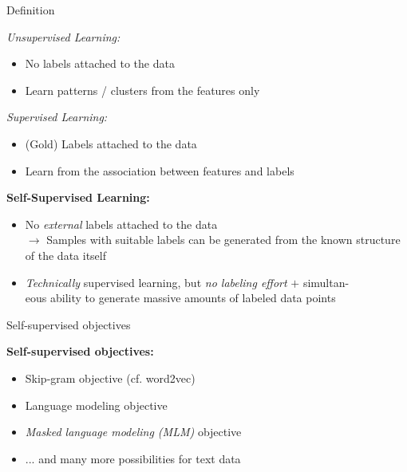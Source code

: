 \documentclass[11pt,compress,t,notes=noshow, xcolor=table]{beamer}
\begin{document}
\begin{frame}{Definition}

	\vfill 
	
	\textit{Unsupervised Learning:}

	\begin{itemize}
		\item No labels attached to the data
		\item Learn patterns / clusters from the features only
	\end{itemize}
	
	\textit{Supervised Learning:}

	\begin{itemize}
		\item (Gold) Labels attached to the data
		\item Learn from the association between features and labels
	\end{itemize}
	
	\textbf{Self-Supervised Learning:}

	\begin{itemize}
		\item No \textit{external} labels attached to the data\\
					$\to$ Samples with suitable labels can be generated from the known structure of the data itself 
		\item \textit{Technically} supervised learning, but \textit{no labeling effort} $+$ simultan-\\eous ability to generate massive amounts of labeled data points
	\end{itemize}
	
	\vfill 
	
\end{frame}


\begin{vbframe}{Self-supervised objectives}

\vfill

\textbf{Self-supervised objectives:}
	
	\begin{itemize}
		\item Skip-gram objective (cf. word2vec)
		\item Language modeling objective
		\item \textit{Masked language modeling (MLM)} objective
		\item ... and many more possibilities for text data
	\end{itemize}
\vfill

\end{vbframe}


\endlecture
\end{document}
